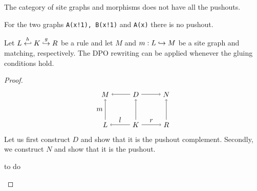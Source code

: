 The category of site graphs and morphisms does not have all the pushouts. %

\begin{example}
  For the two graphs \verb|A(x!1), B(x!1)| and \verb|A(x)| there is no pushout.
\end{example}

\begin{lemma}
  Let $L\overset{h}{\hookleftarrow} K \overset{g}{\hookrightarrow} R$ be a rule and let $M$ and $m:L\hookrightarrow M$ be a site graph and matching, respectively. The DPO rewriting can be applied whenever the gluing conditions hold.
\end{lemma}
\begin{proof}
  \[
  \begin{tikzpicture} %
    \node (l) at (-1.5,0) {\(L\)};
    \node (d) at (0,0) {\(K\)};
    \node (r) at (1.5,0) {\(R\)};
    \node (m) at (-1.5,1.5) {\(M\)};
    \node (d') at (0,1.5) {\(D\)};
    \node (n) at (1.5,1.5) {\(N\)};
    \draw [->] (d) -- node [above,midway] {\(l\)} (l);
    \draw [->] (d) -- node [above,midway] {\(r\)} (r);
    \draw [->] (d') -- (m);
    \draw [->] (d') -- (n);
    \draw [->] (l) -- node [left,midway] {\(m\)}  (m);
    \draw [->] (d) -- (d');
    \draw [->] (r) -- (n);
  \end{tikzpicture}
  \]
  Let us first construct $D$ and show that it is the pushout complement. Secondly, we construct $N$ and show that it is the pushout.

  \begin{mdframed}[backgroundcolor=blue!20]
    to do
  \end{mdframed}
\end{proof}

